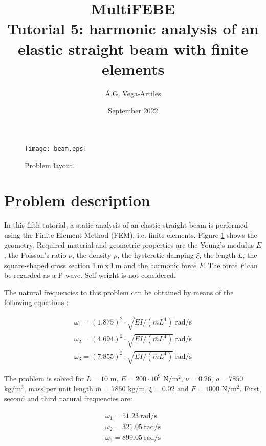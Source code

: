 \documentclass[a4]{article}
\title{MultiFEBE \\ Tutorial 5: harmonic analysis of an elastic straight beam with finite elements}
\author{\'A.G. Vega-Artiles}
\date{September 2022}
\begin{document}
\maketitle

\begin{figure}[h]
	\centering
	\texttt{[image: beam.eps]}
	\caption{Problem layout.}
	\label{fig:beam}
\end{figure}

\section{Problem description}

In this fifth tutorial, a static analysis of an elastic straight beam is performed using the Finite Element Method (FEM), i.e. finite elements. Figure \ref{fig:beam} shows the geometry. Required material and geometric properties are the Young's modulus $E$, the Poisson's ratio $\nu$, the density $\rho$, the hysteretic damping $\xi$, the length $L$, the square-shaped cross section $1 \medspace \mathrm{m} \medspace \mathrm{x} \medspace 1 \medspace \mathrm{m}$ and the harmonic force $F$. The force $F$ can be regarded as a P-wave. Self-weight is not considered. 

The natural frequencies to this problem can be obtained by means of the following equations \cite{clough}:

\begin{equation}
	\begin{array}{l}
		\omega_1 = (1.875)^2 \cdot \sqrt{EI /(\overline{m}L^4)} \medspace \mathrm{rad/s} \\
		\omega_2 = (4.694)^2 \cdot \sqrt{EI /(\overline{m}L^4)} \medspace \mathrm{rad/s} \\
		\omega_3 = (7.855)^2 \cdot \sqrt{EI /(\overline{m}L^4)} \medspace \mathrm{rad/s}
	\end{array}
\end{equation}

The problem is solved for $L=10$ $\mathrm{m}$, $E=200\cdot 10^9$ $\mathrm{N/m^2}$, $\nu=0.26$, $\rho=7850$ $\mathrm{kg/m^3}$, mass per unit length $\overline{m}=7850$ $\mathrm{kg/m}$, $\xi=0.02$ and $F=1000$ $\mathrm{N/m^2}$. First, second and third natural frequencies are: 

\begin{equation}
	\begin{array}{l}
		\omega_1 = 51.23 \medspace \mathrm{rad/s} \\
		\omega_2 = 321.05 \medspace \mathrm{rad/s} \\
		\omega_3 = 899.05 \medspace \mathrm{rad/s}
	\end{array}
\end{equation}
\end{document}
